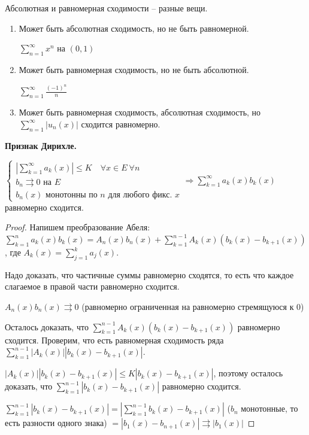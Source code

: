 \begin{remark}
    Абсолютная и равномерная сходимости – разные вещи. 
    \begin{enumerate}
        \item Может быть абсолютная сходимость, но не быть равномерной.
        \begin{example} $\sum\limits_{n=1}^\infty x^n$ на $(0, 1)$ \end{example}
        \item Может быть равномерная сходимость, но не быть абсолютной.
        \begin{example} $\sum\limits_{n=1}^\infty \frac{(-1)^n}{n}$ \end{example}
        \item Может быть равномерная сходимость, абсолютная сходимость, но $\sum\limits_{n=1}^\infty |u_n(x)|$ сходится равномерно.
    \end{enumerate}
\end{remark}

\begin{theorem}
    \textbf{Признак Дирихле.}

    $\left \{\begin{array}{l}
         |\sum\limits_{k=1}^\infty a_k(x)|\leq K\quad \forall x\in E\ \forall n \\
         b_n\rightrightarrows 0\text{ на }E \\
         b_n(x)\text{ монотонны по }n\text{ для любого фикс. }x
    \end{array}\right.\Rightarrow \sum\limits_{k=1}^\infty a_k(x)b_k(x)$ равномерно сходится.
\end{theorem}

\begin{proof}
    Напишем преобразование Абеля: $\sum\limits_{k=1}^n a_k(x)b_k(x)=A_n(x)b_n(x)+\sum\limits_{k=1}^{n-1}A_k(x)(b_k(x)-b_{k+1}(x))$, где $A_k(x)=\sum\limits_{j=1}^ka_j(x)$.

    Надо доказать, что частичные суммы равномерно сходятся, то есть что каждое слагаемое в правой части равномерно сходится.

    $A_n(x)b_n(x)\rightrightarrows 0$ (равномерно ограниченная на равномерно стремящуюся к 0)

    Осталось доказать, что $\sum\limits_{k=1}^{n-1}A_k(x)(b_k(x)-b_{k+1}(x))$ равномерно сходится. Проверим, что есть равномерная сходимость ряда $\sum\limits_{k=1}^{n-1}|A_k(x)||b_k(x)-b_{k+1}(x)|$.

    $|A_k(x)||b_k(x)-b_{k+1}(x)|\leq K|b_k(x)-b_{k+1}(x)|$, поэтому осталось доказать, что $\sum\limits_{k=1}^{n-1}|b_k(x)-b_{k+1}(x)|$ равномерно сходится.

    $\sum\limits_{k=1}^{n-1}|b_k(x)-b_{k+1}(x)|=|\sum\limits_{k=1}^{n-1}b_k(x)-b_{k+1}(x)|$ ($b_n$ монотонные, то есть разности одного знака) $=|b_1(x)-b_{n+1}(x)|\rightrightarrows |b_1(x)|$
\end{proof}


